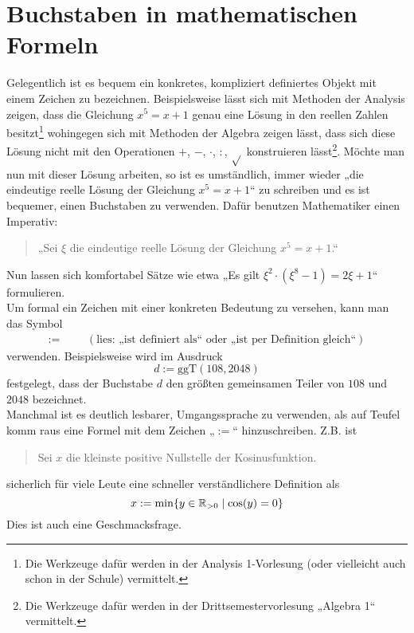 %                                                                 
%
%
%
%





\section{Buchstaben in mathematischen Formeln}


\begin{de}
 Gelegentlich ist es bequem ein konkretes, kompliziert definiertes Objekt mit einem Zeichen zu bezeichnen. Beispielsweise lässt sich mit Methoden der Analysis zeigen, dass die Gleichung $x^5=x+1$ genau eine Lösung in den reellen Zahlen besitzt\footnote{Die Werkzeuge dafür werden in der Analysis 1-Vorlesung (oder vielleicht auch schon in der Schule) vermittelt.} wohingegen sich mit Methoden der Algebra zeigen lässt, dass sich diese Lösung nicht mit den Operationen $+$, $-$, $\cdot$, $:$, $\sqrt{}$ konstruieren lässt\footnote{Die Werkzeuge dafür werden in der Drittsemestervorlesung „Algebra 1“ vermittelt.}. Möchte man nun mit dieser Lösung arbeiten, so ist es umständlich, immer wieder „die eindeutige reelle Lösung der Gleichung $x^5=x+1$“ zu schreiben und es ist bequemer, einen Buchstaben zu verwenden. Dafür benutzen Mathematiker einen Imperativ:
 \begin{quote}
„Sei $\xi$ die eindeutige reelle Lösung der Gleichung $x^5=x+1$.“  
 \end{quote}
 Nun lassen sich komfortabel Sätze wie etwa „Es gilt $\xi^2\cdot (\xi^{8}-1)=2\xi +1$“ formulieren. \\
Um formal ein Zeichen mit einer konkreten Bedeutung zu versehen, kann man das Symbol
 \begin{align*}
  := &&& (\text{lies: „ist definiert als“ oder „ist per Definition gleich“})
 \end{align*}
verwenden. Beispielsweise wird im Ausdruck
 \[ d:= \text{ggT}(108,2048) \]
 festgelegt, dass der Buchstabe $d$ den größten gemeinsamen Teiler von $108$ und $2048$ bezeichnet.  \\
Manchmal ist es deutlich lesbarer, Umgangssprache zu verwenden, als auf Teufel komm raus eine Formel mit dem Zeichen „$:=$“ hinzuschreiben. Z.B. ist
\begin{quote}
 Sei $x$ die kleinste positive Nullstelle der Kosinusfunktion.
\end{quote}
sicherlich für viele Leute eine schneller verständlichere Definition als
\[ x:= \min \{y\in {\mathbb R}_{> 0} \mid \cos(y)=0 \}\]
Dies ist auch eine Geschmacksfrage.
\end{de}



